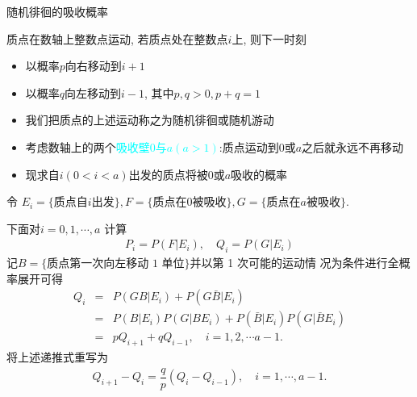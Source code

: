   \begin{frame}{随机徘徊的吸收概率}
	\begin{exam}
		质点在数轴上整数点运动, 若质点处在整数点$i$上, 则下一时刻%
		\begin{itemize}[<+-|alert@+>]
			\item  以概率$p$向右移动到$i+1$
			\item 以概率$q$向左移动到$i-1$, 其中$p,q>0, p+q=1$
			\item 我们把质点的上述运动称之为随机徘徊或随机游动
			\item 考虑数轴上的两个\textcolor{cyan}{吸收壁$0$与$a(a>1)$}:质点运动到$0$或$a$之后就永远不再移动
			\item 现求自$i(0<i<a)$出发的质点将被$0$或$a$吸收的概率
		\end{itemize}
	\end{exam}
\end{frame}


\begin{frame}
	\vspace{0.5cm}
	\hspace{-0.2cm}\jieda 令 $E_i=\{\mbox{质点自}i\mbox{出发}\}, F=\{\mbox{质点在}0\mbox{被吸收}\}, G=\{\mbox{质点在}a\mbox{被吸收}\}$. \pause

	下面对$i=0,1,\cdots,a$ 计算
	\begin{eqnarray*}
		P_i=P(F|E_i), \quad Q_i=P(G|E_i)
	\end{eqnarray*}
	\pause 记$B=\{\mbox{质点第一次向左移动 1 单位}\}$并以第 1 次可能的运动情
	况为条件进行全概率展开可得
	\begin{eqnarray*}
		Q_i&=&P(GB|E_i)+P(G\bar{B}|E_i)\\
		&=&P(B|E_i)P(G|BE_i)+P(\bar{B}|E_i)P(G|\bar{B}E_i)\\
		&=&pQ_{i+1}+qQ_{i-1}, \quad i=1,2,\cdots a-1.
	\end{eqnarray*}
	\pause 将上述递推式重写为
	\begin{eqnarray}\label{eq:ditui1}
		Q_{i+1}-Q_i=\dfrac{q}{p}(Q_i-Q_{i-1}), \quad i=1,\cdots, a-1.
	\end{eqnarray}

\end{frame}

